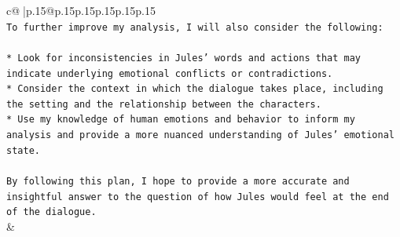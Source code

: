 \documentclass{article}
\begin{document}
{\begin{supertabular}{c@{$\;$}|p{.15\linewidth}@{}p{.15\linewidth}p{.15\linewidth}p{.15\linewidth}p{.15\linewidth}p{.15\linewidth}}
{{{\\ 
\texttt{To further improve my analysis, I will also consider the following:} \\
\\ 
\texttt{* Look for inconsistencies in Jules' words and actions that may indicate underlying emotional conflicts or contradictions.} \\
\texttt{* Consider the context in which the dialogue takes place, including the setting and the relationship between the characters.} \\
\texttt{* Use my knowledge of human emotions and behavior to inform my analysis and provide a more nuanced understanding of Jules' emotional state.} \\
\\ 
\texttt{By following this plan, I hope to provide a more accurate and insightful answer to the question of how Jules would feel at the end of the dialogue.} \\
            }
        }
    }
    & \\ \\

\end{supertabular}
}
\end{document}
